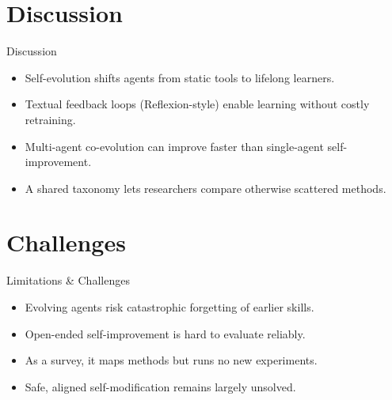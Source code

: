 \documentclass[10pt]{beamer}
\begin{document}
\section{Discussion}
\begin{frame}{Discussion}
\begin{itemize}
  \item Self-evolution shifts agents from static tools to lifelong learners.
  \item Textual feedback loops (Reflexion-style) enable learning without costly retraining.
  \item Multi-agent co-evolution can improve faster than single-agent self-improvement.
  \item A shared taxonomy lets researchers compare otherwise scattered methods.
\end{itemize}
\end{frame}
\section{Challenges}
\begin{frame}{Limitations \& Challenges}
\begin{itemize}
  \item Evolving agents risk catastrophic forgetting of earlier skills.
  \item Open-ended self-improvement is hard to evaluate reliably.
  \item As a survey, it maps methods but runs no new experiments.
  \item Safe, aligned self-modification remains largely unsolved.
\end{itemize}
\end{frame}
\end{document}
